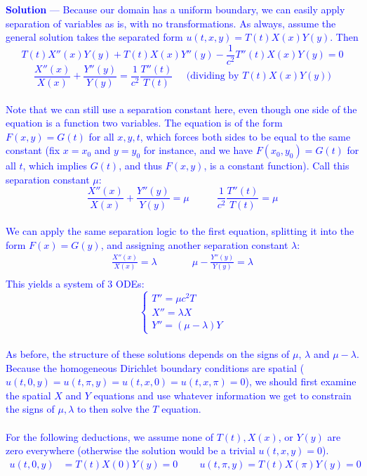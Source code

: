 \documentclass[12pt]{article}
\begin{document}
\textcolor{blue}{\textbf{Solution} — Because our domain has a uniform boundary, we can easily apply separation of variables as is, with no transformations. As always, assume the general solution takes the separated form $u(t,x,y) = T(t)X(x)Y(y)$. Then
$$T(t)X''(x)Y(y) + T(t)X(x)Y''(y) - \frac{1}{c^2} T''(t)X(x)Y(y) = 0$$
$$\frac{X''(x)}{X(x)} + \frac{Y''(y)}{Y(y)} = \frac{1}{c^2} \frac{T''(t)}{T(t)} \;\;\;\;\; \text{(dividing by $T(t)X(x)Y(y)$)}$$ \\
Note that we can still use a separation constant here, even though one side of the equation is a function two variables. The equation is of the form $F(x,y) = G(t)$ for all $x,y,t$, which forces both sides to be equal to the same constant (fix $x=x_0$ and $y=y_0$ for instance, and we have $F(x_0, y_0) = G(t)$ for all $t$, which implies $G(t)$, and thus $F(x,y)$, is a constant function). Call this separation constant $\mu$: \\
$$\frac{X''(x)}{X(x)} + \frac{Y''(y)}{Y(y)}  = \mu \;\;\;\;\;\;\;\;\;\; \frac{1}{c^2} \frac{T''(t)}{T(t)} = \mu$$ \\
We can apply the same separation logic to the first equation, splitting it into the form $F(x) = G(y)$, and assigning another separation constant $\lambda$:
\begin{align*}
\frac{X''(x)}{X(x)} =  \lambda  &\;\;\;\;\;\;\;\;\;\;  \mu - \frac{Y''(y)}{Y(y)} = \lambda \\
\end{align*}
This yields a system of 3 ODEs:
$$\begin{cases}
T'' = \mu c^2 T \\
X'' = \lambda X \\
Y'' = (\mu - \lambda) Y
\end{cases}$$ \\
As before, the structure of these solutions depends on the signs of $\mu$, $\lambda$ and $\mu - \lambda$. Because the homogeneous Dirichlet boundary conditions are spatial ($u(t,0,y) = u(t,\pi,y) = u(t,x,0) = u(t,x,\pi) = 0$), we should first examine the spatial $X$ and $Y$ equations and use whatever information we get to constrain the signs of $\mu,\lambda$ to then solve the $T$ equation. \\ \\ For the following deductions, we assume none of $T(t), X(x)$, or $Y(y)$ are zero everywhere (otherwise the solution would be a trivial $u(t,x,y) = 0$). \\
\begin{align*}
u(t,0,y) &= T(t)X(0)Y(y) = 0 \;\;\;\;\;\;\;\; u(t,\pi,y) = T(t)X(\pi)Y(y) = 0  \\

\end{align*}}
\end{document}

